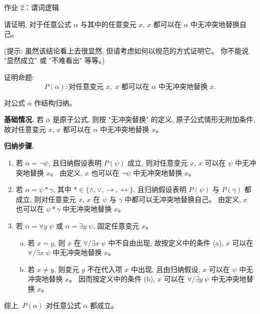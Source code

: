 
\begin{frame}[allowframebreaks]{作业 2：谓词逻辑}

\begin{problem}[一阶谓词逻辑: 替换]
  请证明, 对于任意公式 $\alpha$ 与其中的任意变元 $x$,
  $x$ 都可以在 $\alpha$ 中无冲突地替换自己。

  \noindent (提示: 虽然该结论看上去很显然, 但请考虑如何以规范的方式证明它。
  你不能说 "显然成立" 或 "不难看出" 等等。)
\end{problem}

\begin{solution}
  证明命题:
  \[
    P(\alpha): \text{对任意变元 } x,\; x \text{ 都可以在 } \alpha \text{ 中无冲突地替换 } x.
  \]

  对公式 $\alpha$ 作结构归纳。

  \textbf{基础情况.}
  若 $\alpha$ 是原子公式, 则按 "无冲突替换" 的定义,
  原子公式情形无附加条件, 故对任意变元 $x$,
  $x$ 都可以在 $\alpha$ 中无冲突地替换 $x$。

  \textbf{归纳步骤.}

  \begin{enumerate}[(1)]
    \item 若 $\alpha = \lnot \psi$,
      且归纳假设表明 $P(\psi)$ 成立,
      则对任意变元 $x$,
      $x$ 可以在 $\psi$ 中无冲突地替换 $x$。
      由定义,
      $x$ 也可以在 $\lnot \psi$ 中无冲突地替换 $x$。

    \item 若 $\alpha = \psi \ast \gamma$,
      其中 $\ast \in \{\land, \lor, \to, \leftrightarrow\}$,
      且归纳假设表明 $P(\psi)$ 与 $P(\gamma)$ 都成立,
      则对任意变元 $x$,
      $x$ 在 $\psi$ 与 $\gamma$ 中都可以无冲突地替换自己。
      由定义,
      $x$ 也可以在 $\psi \ast \gamma$ 中无冲突地替换 $x$。

    \item 若 $\alpha = \forall y\; \psi$ 或 $\alpha = \exists y\; \psi$,
      固定任意变元 $x$。

      \begin{enumerate}[(a)]
        \item 若 $x = y$, 则 $x$ 在 $\forall/\exists x\; \psi$ 中不自由出现,
          故按定义中的条件 (a),
          $x$ 可以在 $\forall/\exists x\; \psi$ 中无冲突地替换 $x$。

        \item 若 $x \neq y$, 则变元 $y$ 不在代入项 $x$ 中出现,
          且由归纳假设, $x$ 可以在 $\psi$ 中无冲突地替换 $x$。
          因而按定义中的条件 (b),
          $x$ 可以在 $\forall/\exists y\; \psi$ 中无冲突地替换 $x$。
      \end{enumerate}
  \end{enumerate}
  综上, $P(\alpha)$ 对任意公式 $\alpha$ 都成立。
\end{solution}


\end{frame}
